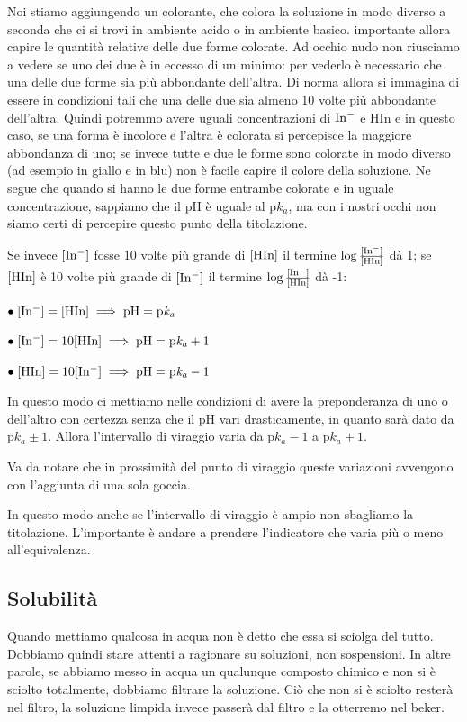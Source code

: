 Noi stiamo aggiungendo un colorante, che colora la soluzione in modo diverso a seconda che ci si trovi in ambiente acido o in ambiente basico. \E importante allora capire le quantità relative delle due forme colorate. Ad occhio nudo non riusciamo a vedere se uno dei due è in eccesso di un minimo: per vederlo è necessario che una delle due forme sia più abbondante dell'altra. Di norma allora si immagina di essere in condizioni tali che una delle due sia almeno 10 volte più abbondante dell'altra. Quindi potremmo avere uguali concentrazioni di $\rm In^-$ e HIn e in questo caso, se una forma è incolore e l'altra è colorata si percepisce la maggiore abbondanza di uno; se invece tutte e due le forme sono colorate in modo diverso (ad esempio in giallo e in blu) non è facile capire il colore della soluzione. Ne segue che quando si hanno le due forme entrambe colorate e in uguale concentrazione, sappiamo che il pH è uguale al p$k_a$, ma con i nostri occhi non siamo certi di percepire questo punto della titolazione.

Se invece $\rm [In^-]$ fosse 10 volte più grande di $\rm [HIn]$ il termine $\rm \log{\frac{[In^-]}{[HIn]}}$ dà 1; se $\rm [HIn]$ è 10 volte più grande di $\rm [In^-]$ il termine $\rm \log{\frac{[In^-]}{[HIn]}}$ dà -1:

\vspace{0.2cm}$\bullet \rm \; [In^-]=[HIn] \implies pH=p\textit{k}_{\textit{a}}$

\vspace{0.2cm}$\bullet \rm \; [In^-]=10[HIn] \implies pH=p\textit{k}_{\textit{a}}+1$

\vspace{0.2cm}$\bullet \rm \; [HIn]=10[In^-] \implies pH=p\textit{k}_{\textit{a}}-1$

\vspace{0.2cm}In questo modo ci mettiamo nelle condizioni di avere la preponderanza di uno o dell'altro con certezza senza che il pH vari drasticamente, in quanto sarà dato da p$k_a \pm 1$. Allora l'intervallo di viraggio varia da p$k_a - 1$ a p$k_a + 1$.

Va da notare che in prossimità del punto di viraggio queste variazioni avvengono con l'aggiunta di una sola goccia.

In questo modo anche se l'intervallo di viraggio è ampio non sbagliamo la titolazione. L'importante è andare a prendere l'indicatore che varia più o meno all'equivalenza.

\subsection{Solubilità}
Quando mettiamo qualcosa in acqua non è detto che essa si sciolga del tutto. Dobbiamo quindi stare attenti a ragionare su soluzioni, non sospensioni. In altre parole, se abbiamo messo in acqua un qualunque composto chimico e non si è sciolto totalmente, dobbiamo filtrare la soluzione. Ciò che non si è sciolto resterà nel filtro, la soluzione limpida invece passerà dal filtro e la otterremo nel beker.

